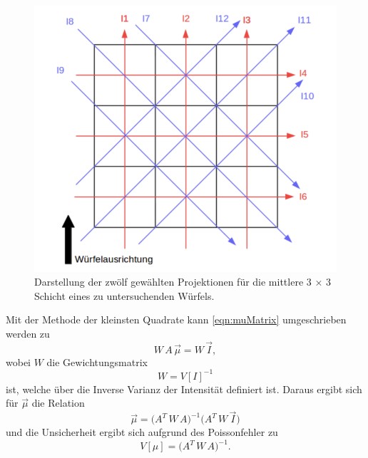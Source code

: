 \begin{figure}[H]
    \centering
    \includegraphics[scale=0.7]{Abbildungen/Ausrichtung.png}
    \caption{Darstellung der zwölf gewählten Projektionen für die mittlere 3 × 3 Schicht eines zu untersuchenden Würfels.\cite{V14}}
    \label{fig:Ausrichtung}
\end{figure}

Mit der Methode der kleinsten Quadrate kann \autoref{eqn:muMatrix} umgeschrieben werden zu
\begin{equation}
    W \,A \,\vec{\mu} = W \,\vec{I},
\end{equation}
wobei $W$ die Gewichtungsmatrix
\begin{equation}
    W = V[I]^{-1}
\end{equation}
ist, welche über die Inverse Varianz der Intensität definiert ist. Daraus ergibt sich für $\vec{\mu}$ die Relation
\begin{equation}
    \vec{\mu} = \biggl(A^T\, W \,A\biggr)^{-1} \biggl(A^T \,W \,\vec{I}\biggr)
    \label{eqn:mu_gleichung}
\end{equation}
und die Unsicherheit ergibt sich aufgrund des Poissonfehler zu
\begin{equation}
    V[\mu] = \biggl(A^T\, W \,A\biggr)^{-1}.
    \label{eqn:Unsicherheit}
\end{equation}



